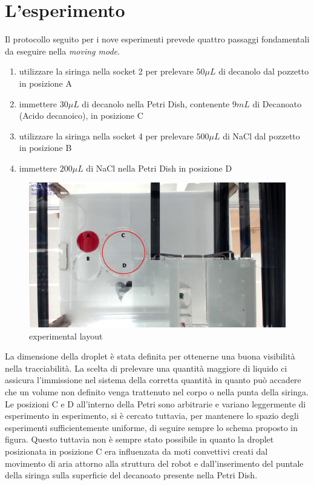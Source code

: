 \section{L'esperimento}
\label{sec:456}
Il protocollo seguito per i nove esperimenti prevede quattro passaggi fondamentali da eseguire nella \emph{moving mode}. 
\begin{enumerate}
\item utilizzare la siringa nella socket 2 per prelevare $50\mu L$ di decanolo dal pozzetto in posizione A
\item immettere $30\mu L$ di decanolo nella Petri Dish, contenente $9mL$ di Decanoato (Acido decanoico), in posizione C
\item  utilizzare la siringa nella socket 4 per prelevare $500\mu L$ di NaCl dal pozzetto in posizione B
\item immettere $200\mu L$ di NaCl nella Petri Dish in posizione D 
\end{enumerate}
\begin{figure}[h]
	  \includegraphics[scale=0.30]{immagini/exp1.jpg}
		\centering
	 \caption{experimental layout}
	\end{figure} 
La dimensione della droplet è stata definita per ottenerne una buona visibilità nella tracciabilità. 
La scelta di prelevare una quantità maggiore di liquido ci assicura l'immissione nel sistema della corretta quantità in quanto può accadere che un volume non definito venga trattenuto nel corpo o nella punta della siringa.
Le posizioni C e D all'interno della Petri sono arbitrarie e variano leggermente di esperimento in esperimento, si è cercato tuttavia, per mantenere lo spazio degli esperimenti sufficientemente uniforme, di seguire sempre lo schema proposto in figura. Questo tuttavia non è sempre stato possibile in quanto la droplet posizionata in posizione C era influenzata da moti convettivi creati dal movimento di aria attorno alla struttura del robot e dall'inserimento del puntale della siringa sulla superficie del decanoato presente nella Petri Dish. 

